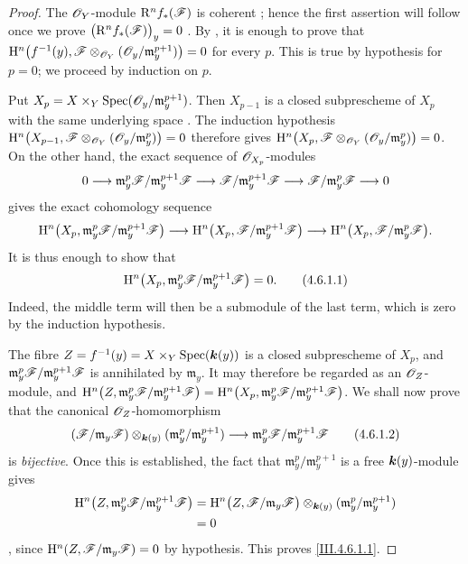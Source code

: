 \begin{proof}
The $\mathscr{O}_Y$-module $\mathrm{R}^n f_*(\mathscr{F})$ is coherent
; hence the first assertion will follow once we prove $\bigl(\mathrm{R}^n f_*(\mathscr{F})\bigr)_y=0$
.  By , it is enough to prove that $\mathrm{H}^n\bigl(f^{-1}(y),
\mathscr{F}\otimes_{\mathscr{O}_Y}
(\mathscr{O}_y/\mathfrak m_y^{p+1})\bigr)=0$
for every $p$.  This is true by hypothesis for $p=0$; we proceed by
induction on $p$.

Put $X_p=X\times_Y
\operatorname{Spec}(\mathscr{O}_y/\mathfrak m_y^{p+1})$.
Then $X_{p-1}$ is a closed subprescheme of $X_p$ with the same
underlying space .  The induction hypothesis $\mathrm{H}^n\bigl(X_{p-1},
\mathscr{F}\otimes_{\mathscr{O}_Y}
(\mathscr{O}_y/\mathfrak m_y^p)\bigr)=0$
therefore gives $\mathrm{H}^n\bigl(X_p,
\mathscr{F}\otimes_{\mathscr{O}_Y}
(\mathscr{O}_y/\mathfrak m_y^p)\bigr)=0$.
On the other hand, the exact sequence of $\mathscr{O}_{X_p}$-modules
\[
  0\longrightarrow
  \mathfrak m_y^p\mathscr{F}/\mathfrak m_y^{p+1}\mathscr{F}
  \longrightarrow
  \mathscr{F}/\mathfrak m_y^{p+1}\mathscr{F}
  \longrightarrow
  \mathscr{F}/\mathfrak m_y^p\mathscr{F}
  \longrightarrow0
\]
gives the exact cohomology sequence
\[
  \mathrm{H}^n\bigl(X_p,
    \mathfrak m_y^p\mathscr{F}/\mathfrak m_y^{p+1}\mathscr{F}\bigr)
  \longrightarrow
  \mathrm{H}^n\bigl(X_p,\mathscr{F}/\mathfrak m_y^{p+1}\mathscr{F}\bigr)
  \longrightarrow
  \mathrm{H}^n\bigl(X_p,\mathscr{F}/\mathfrak m_y^p\mathscr{F}\bigr).
\]
It is thus enough to show that
\[
\label{III.4.6.1.1}
  \mathrm{H}^n\bigl(X_p,
    \mathfrak m_y^p\mathscr{F}/\mathfrak m_y^{p+1}\mathscr{F}\bigr)=0.
  \tag{4.6.1.1}
\]
Indeed, the middle term will then be a submodule of the last term,
which is zero by the induction hypothesis.


The fibre $Z=f^{-1}(y)=X\times_Y\operatorname{Spec}(\boldsymbol{k}(y))$
is a closed subprescheme of $X_p$, and
$\mathfrak m_y^p\mathscr{F}/\mathfrak m_y^{p+1}\mathscr{F}$ is annihilated by
$\mathfrak m_y$.  It may therefore be regarded as an
$\mathscr{O}_Z$-module, and $\mathrm{H}^n\bigl(Z,
\mathfrak m_y^p\mathscr{F}/\mathfrak m_y^{p+1}\mathscr{F}\bigr)
=
\mathrm{H}^n\bigl(X_p,
\mathfrak m_y^p\mathscr{F}/\mathfrak m_y^{p+1}\mathscr{F}\bigr)$.
We shall now prove that the canonical $\mathscr{O}_Z$-homomorphism
\[
\label{III.4.6.1.2}
  (\mathscr{F}/\mathfrak m_y\mathscr{F})
    \otimes_{\boldsymbol{k}(y)}
      (\mathfrak m_y^p/\mathfrak m_y^{p+1})
  \longrightarrow
  \mathfrak m_y^p\mathscr{F}/\mathfrak m_y^{p+1}\mathscr{F}
  \tag{4.6.1.2}
\]
is \emph{bijective}.  Once this is established, the fact that
$\mathfrak m_y^p/\mathfrak m_y^{p+1}$ is a free
$\boldsymbol{k}(y)$-module gives
\[
\begin{split}
  \mathrm{H}^n\bigl(Z,
    \mathfrak m_y^p\mathscr{F}/\mathfrak m_y^{p+1}\mathscr{F}\bigr)
  &=
  \mathrm{H}^n\bigl(Z,\mathscr{F}/\mathfrak m_y\mathscr{F}\bigr)
    \otimes_{\boldsymbol{k}(y)}
      (\mathfrak m_y^p/\mathfrak m_y^{p+1})\\
  &=0
\end{split}
\]
, since
$\mathrm{H}^n(Z,\mathscr{F}/\mathfrak m_y\mathscr{F})=0$ by hypothesis.  This proves
\eqref{III.4.6.1.1}.


\end{proof}
